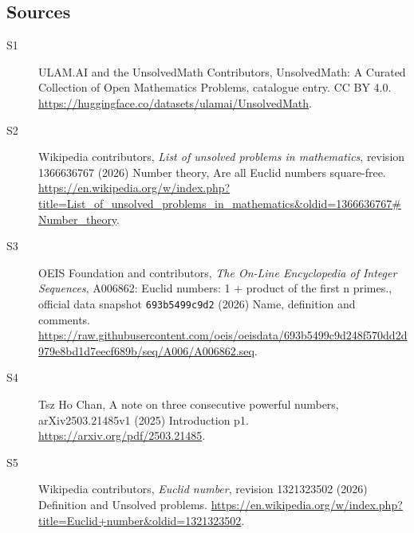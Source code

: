 \documentclass[11pt]{article}
\begin{document}
\subsection{Sources}
\begin{description}
\item[\hypertarget{source:statement:1}{S1}] ULAM.AI and the UnsolvedMath Contributors, UnsolvedMath: A Curated Collection of Open Mathematics Problems, catalogue entry. CC BY 4.0. \url{https://huggingface.co/datasets/ulamai/UnsolvedMath}.
\item[\hypertarget{source:statement:2}{S2}] Wikipedia contributors, \emph{List of unsolved problems in mathematics}, revision 1366636767 (2026) Number theory, Are all Euclid numbers square-free. \url{https://en.wikipedia.org/w/index.php?title=List_of_unsolved_problems_in_mathematics&oldid=1366636767#Number_theory}.
\item[\hypertarget{source:statement:3}{S3}] OEIS Foundation and contributors, \emph{The On-Line Encyclopedia of Integer Sequences}, A006862: Euclid numbers: 1 + product of the first n primes., official data snapshot \texttt{693b5499c9d2} (2026) Name, definition and comments. \url{https://raw.githubusercontent.com/oeis/oeisdata/693b5499c9d248f570dd2d979e8bd1d7eecf689b/seq/A006/A006862.seq}.
\item[\hypertarget{source:statement:4}{S4}] Tsz Ho Chan, A note on three consecutive powerful numbers, arXiv2503.21485v1 (2025) Introduction p1. \url{https://arxiv.org/pdf/2503.21485}.
\item[\hypertarget{source:statement:5}{S5}] Wikipedia contributors, \emph{Euclid number}, revision 1321323502 (2026) Definition and Unsolved problems. \url{https://en.wikipedia.org/w/index.php?title=Euclid+number&oldid=1321323502}.
\end{description}
\label{end:statement}
\end{document}
